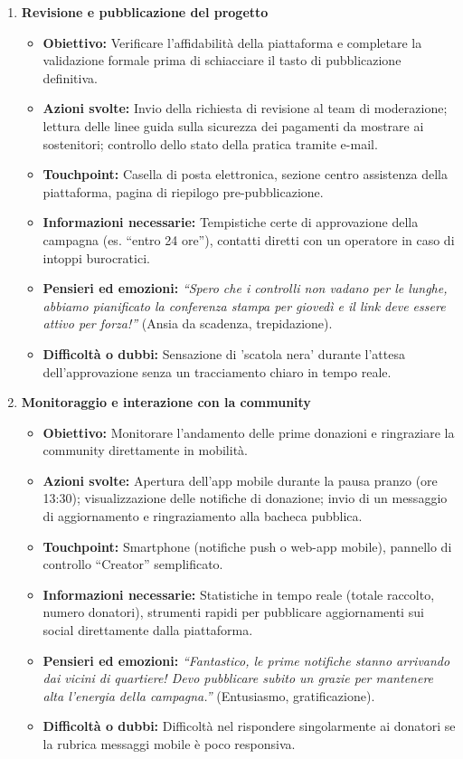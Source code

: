 \documentclass[11pt,a4paper]{article}
\begin{document}
\begin{enumerate}
        \item \textbf{Revisione e pubblicazione del progetto}
        \begin{itemize}
            \item \textbf{Obiettivo:} Verificare l'affidabilità della piattaforma e completare la validazione formale prima di schiacciare il tasto di pubblicazione definitiva.
            \item \textbf{Azioni svolte:} Invio della richiesta di revisione al team di moderazione; lettura delle linee guida sulla sicurezza dei pagamenti da mostrare ai sostenitori; controllo dello stato della pratica tramite e-mail.
            \item \textbf{Touchpoint:} Casella di posta elettronica, sezione centro assistenza della piattaforma, pagina di riepilogo pre-pubblicazione.
            \item \textbf{Informazioni necessarie:} Tempistiche certe di approvazione della campagna (es. ``entro 24 ore''), contatti diretti con un operatore in caso di intoppi burocratici.
            \item \textbf{Pensieri ed emozioni:} \textit{``Spero che i controlli non vadano per le lunghe, abbiamo pianificato la conferenza stampa per giovedì e il link deve essere attivo per forza!''} (Ansia da scadenza, trepidazione).
            \item \textbf{Difficoltà o dubbi:} Sensazione di 'scatola nera' durante l'attesa dell'approvazione senza un tracciamento chiaro in tempo reale.
        \end{itemize}

        \item \textbf{Monitoraggio e interazione con la community}
        \begin{itemize}
            \item \textbf{Obiettivo:} Monitorare l'andamento delle prime donazioni e ringraziare la community direttamente in mobilità.
            \item \textbf{Azioni svolte:} Apertura dell'app mobile durante la pausa pranzo (ore 13:30); visualizzazione delle notifiche di donazione; invio di un messaggio di aggiornamento e ringraziamento alla bacheca pubblica.
            \item \textbf{Touchpoint:} Smartphone (notifiche push o web-app mobile), pannello di controllo ``Creator'' semplificato.
            \item \textbf{Informazioni necessarie:} Statistiche in tempo reale (totale raccolto, numero donatori), strumenti rapidi per pubblicare aggiornamenti sui social direttamente dalla piattaforma.
            \item \textbf{Pensieri ed emozioni:} \textit{``Fantastico, le prime notifiche stanno arrivando dai vicini di quartiere! Devo pubblicare subito un grazie per mantenere alta l'energia della campagna.''} (Entusiasmo, gratificazione).
            \item \textbf{Difficoltà o dubbi:} Difficoltà nel rispondere singolarmente ai donatori se la rubrica messaggi mobile è poco responsiva.
        \end{itemize}

    \end{enumerate}
\end{document}

